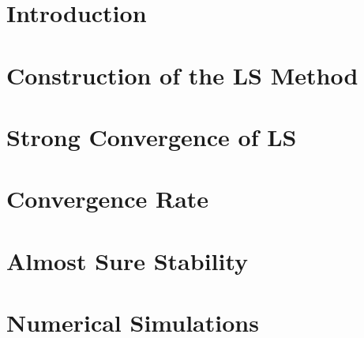 \label{paper:paperB}
	\section{Introduction}
		
		
	\section{Construction of the LS Method}
		
	\section{Strong Convergence of LS}
		
	\section{Convergence Rate}
		
	\section{Almost Sure Stability}
		
	\section{Numerical Simulations}
		